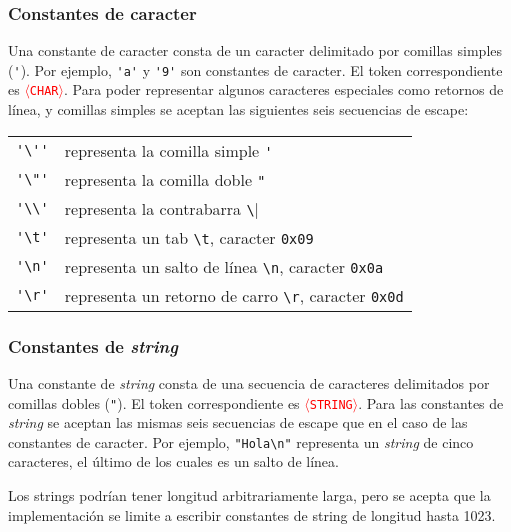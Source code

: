 \documentclass{article}
\newcommand{\tok}[1]{\textcolor{red}{{\texttt{$\langle$#1$\rangle$}}}}
\begin{document}
\subsubsection*{Constantes de caracter}
  Una constante de caracter consta de un caracter delimitado por comillas
  simples (\verb|'|).
  Por ejemplo, \verb|'a'| y \verb|'9'| son constantes de caracter.
  El token correspondiente es \tok{CHAR}.
  Para poder representar algunos caracteres especiales como retornos de línea,
  y comillas simples se aceptan las siguientes seis secuencias de escape:
  \begin{center}
  \begin{tabular}{ll}
  \verb|'\''| & representa la comilla simple \verb|'| \\
  \verb|'\"'| & representa la comilla doble \verb|"| \\
  \verb|'\\'| & representa la contrabarra \verb|\| \\
  \verb|'\t'| & representa un tab \verb|\t|, caracter \texttt{0x09}\\
  \verb|'\n'| & representa un salto de línea \verb|\n|, caracter \texttt{0x0a}\\
  \verb|'\r'| & representa un retorno de carro \verb|\r|, caracter \texttt{0x0d}\\
  \end{tabular}
  \end{center}
\subsubsection*{Constantes de {\em string}}
  Una constante de {\em string} consta de una secuencia de caracteres
delimitados por comillas dobles (\verb|"|).
El token correspondiente es \tok{STRING}.
Para las constantes de {\em string} se aceptan las mismas
seis secuencias de escape que en el caso de las constantes de
caracter. Por ejemplo, \verb|"Hola\n"| representa un {\em string}
de cinco caracteres, el último de los cuales es un salto de línea.

Los strings podrían tener longitud arbitrariamente larga,
pero se acepta que la implementación se limite a escribir constantes
de string de longitud hasta 1023.
\end{document}
